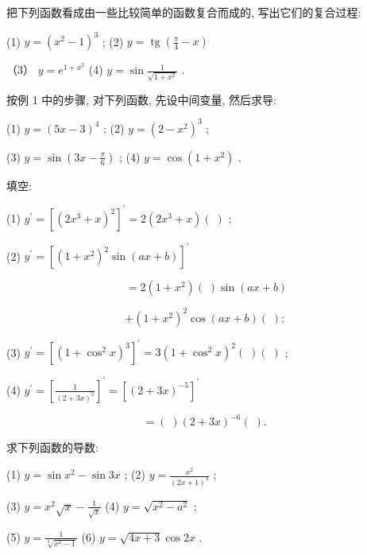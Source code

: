 \documentclass[lang=cn,newtx,10pt,scheme=chinese]{elegantbook}
\begin{document}
\begin{problemset}[练习]

\item 把下列函数看成由一些比较简单的函数复合而成的, 写出它们的复合过程:

(1) \(y = {\left( {x}^{2} - 1\right) }^{3}\) ; (2) \(y = \operatorname{tg}\left( {\frac{\pi }{4} - x}\right)\)

（3） \(y = {e}^{1 + {x}^{2}}\) (4) \(y = \sin \frac{1}{\sqrt{1 + {x}^{2}}}\) .

\item 按例 1 中的步骤, 对下列函数, 先设中间变量, 然后求导:

(1) \(y = {\left( 5x - 3\right) }^{4}\) ; (2) \(y = {\left( 2 - {x}^{2}\right) }^{3}\) ;

(3) \(y = \sin \left( {{3x} - \frac{\pi }{6}}\right)\) ; (4) \(y = \cos \left( {1 + {x}^{2}}\right)\) .

\item 填空:

(1) \({y}^{\prime } = {\left\lbrack {\left( 2{x}^{3} + x\right) }^{2}\right\rbrack }^{\prime } = 2\left( {2{x}^{3} + x}\right) \left( \;\right)\) ;

(2) \({y}^{\prime } = {\left\lbrack {\left( 1 + {x}^{2}\right) }^{2}\sin \left( ax + b\right) \right\rbrack }^{\prime }\)

\[
= 2\left( {1 + {x}^{2}}\right) \left( \;\right) \sin \left( {{ax} + b}\right)
\]

\[
+ {\left( 1 + {x}^{2}\right) }^{2}\cos \left( {{ax} + b}\right) \left( \;\right) \text{; }
\]

(3) \({y}^{\prime } = {\left\lbrack {\left( 1 + {\cos }^{2}x\right) }^{3}\right\rbrack }^{\prime } = 3{\left( 1 + {\cos }^{2}x\right) }^{2}\left( \;\right) \left( \;\right)\) ;

(4) \({y}^{\prime } = {\left\lbrack \frac{1}{{\left( 2 + 3x\right) }^{5}}\right\rbrack }^{\prime } = {\left\lbrack {\left( 2 + 3x\right) }^{-5}\right\rbrack }^{\prime }\)

\[
= \left( \;\right) {\left( 2 + 3x\right) }^{-6}\left( \;\right) \text{. }
\]

\item 求下列函数的导数:

(1) \(y = \sin {x}^{2} - \sin {3x}\) ; (2) \(y = \frac{{x}^{2}}{{\left( 2x + 1\right) }^{3}}\) ;

(3) \(y = {x}^{2}\sqrt{x} - \frac{1}{\sqrt{x}}\) (4) \(y = \sqrt{{x}^{2} - {a}^{2}}\) ;

(5) \(y = \frac{1}{\sqrt[3]{{x}^{2} - 1}}\) (6) \(y = \sqrt{{4x} + 3}\cos {2x}\) .
\end{problemset}
\end{document}
